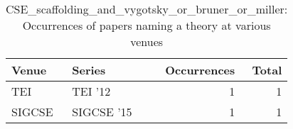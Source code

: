 \begin{table*}[t]
\begin{tabular}{llrr}
Venue & Series & Occurrences & Total\\\hline
\multirow{1}{*}{TEI } & TEI '12 & 1 & \multirow{1}{*}{1}\\
\multirow{1}{*}{SIGCSE } & SIGCSE '15 & 1 & \multirow{1}{*}{1}\\
\end{tabular}
\caption{CSE\_scaffolding\_and\_vygotsky\_or\_bruner\_or\_miller: Occurrences of papers naming a theory at various venues}
\end{table*}